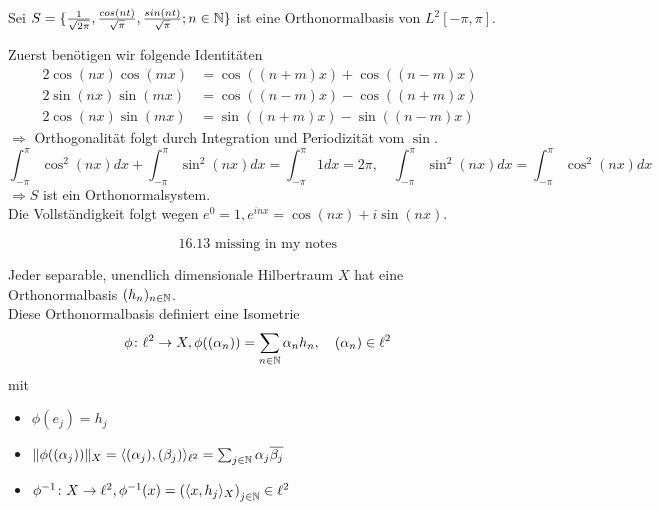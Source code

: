 \begin{beispiel}
	Sei $S = \{ \frac{1}{\sqrt{2 \pi}}, \frac{cos(nt)}{\sqrt{\pi}}, \frac{sin(nt)}{\sqrt{\pi}}; n \in \mathbb{N} \}$ ist eine Orthonormalbasis von $L^{2}[-\pi, \pi]$.	
\end{beispiel}

\begin{beweis}
	Zuerst benötigen wir folgende Identitäten
	\begin{align*}
		2 \cos(nx) \cos(mx) & = \cos((n + m) x) + \cos( (n - m) x) \\
		2 \sin(nx) \sin(mx) & = \cos((n - m) x) - \cos( (n + m) x) \\
		2 \cos(nx) \sin(mx) & = \sin((n + m) x) - \sin( (n - m) x) 
	\end{align*}
	$\Rightarrow$ Orthogonalität folgt durch Integration und Periodizität vom $\sin$.
	\[ \int_{-\pi}^{\pi} \cos^{2}(nx) dx + \int_{-\pi}^{\pi} \sin^{2}(nx) dx = \int_{-\pi}^{\pi} 1 dx = 2 \pi, \quad \int_{-\pi}^{\pi} \sin^{2}(nx) dx = \int_{-\pi}^{\pi} \cos^{2}(nx) dx \]
	$\Rightarrow S$ ist ein Orthonormalsystem. \\
	Die Vollständigkeit folgt wegen $e^{0} = 1, e^{inx} = \cos(nx) + i \sin(nx)$.
\end{beweis}


\[ 16.13 \text{ missing in my notes } \] \setcounter{satz}{13} %


\begin{satz}
	Jeder separable, unendlich dimensionale Hilbertraum $X$ hat eine Orthonormalbasis $(h_{n})_{n \in \mathbb{N}}	$. \\
	Diese Orthonormalbasis definiert eine Isometrie
		\[ \phi \colon \ell^{2} \rightarrow X, \phi( (\alpha_{n}) ) = \sum_{n \in \MdN} \alpha_{n} h_{n}, \quad (\alpha_{n}) \in \ell^{2} \]
	mit 
	\begin{itemize}
		\item $\phi( e_{j} ) = h_{j}$
		\item $\| \phi( (\alpha_{j}) ) \|_{X} = \langle (\alpha_{j}),(\beta_{j}) \rangle_{\ell^{2}} = \sum_{j \in \mathbb{N}} \alpha_{j} \overline{\beta_{j}}$
		\item $\phi^{-1} \colon X \rightarrow \ell^{2}, \phi^{-1}(x) = \left( \langle x, h_{j} \rangle_{X} \right)_{j \in \mathbb{N}} \in \ell^{2}$
	\end{itemize}
\end{satz}

